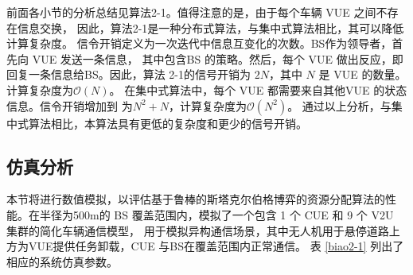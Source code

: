 前面各小节的分析总结见算法2-1。值得注意的是，由于每个车辆 VUE 之间不存在信息交换，
因此，算法2-1是一种分布式算法，与集中式算法相比，其可以降低计算复杂度。
信令开销定义为一次迭代中信息互变化的次数。BS作为领导者，首先向  VUE 发送一条信息， 其中包含BS
的策略。然后，每个 VUE  做出反应，即回复一条信息给BS。因此，算法 2-1的信号开销为 $2N$，其中
$N$ 是  VUE  的数量。计算复杂度为$\mathcal{O}\left(N\right)$。 在集中式算法中，每个 VUE
都需要来自其他VUE 的状态信息。信令开销增加到 为$N^2+N$，计算复杂度为$\mathcal{O}\left(N^2\right)$。
通过以上分析，与集中式算法相比，本算法具有更低的复杂度和更少的信号开销。
\subsection{仿真分析}\label{section2-4-2}
本节将进行数值模拟，以评估基于鲁棒的斯塔克尔伯格博弈的资源分配算法的性能。在半径为500m的 BS 覆盖范围内，模拟了一个包含 1 个 CUE 和 9 个 V2U 集群的简化车辆通信模型，
用于模拟异构通信场景，其中无人机用于悬停道路上方为VUE提供任务卸载，CUE 与BS在覆盖范围内正常通信。
表 \ref{biao2-1} 列出了相应的系统仿真参数。

